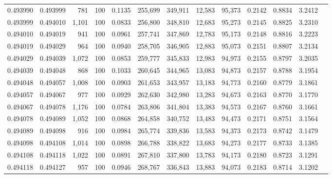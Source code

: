 \begin{tabular}{rrrrrrrrrrrrr}
0.493990 & 0.493999 &   781 & 100 &                                     0.1135 & 255,699 & 349,911 &  12,583 &  95,373 & 0.2142 & 0.8834 & 3.2412 \\
0.493999 & 0.494010 & 1,101 & 100 &                                     0.0833 & 256,800 & 348,810 &  12,683 &  95,273 & 0.2145 & 0.8825 & 3.2310 \\
0.494010 & 0.494019 &   941 & 100 &                                     0.0961 & 257,741 & 347,869 &  12,783 &  95,173 & 0.2148 & 0.8816 & 3.2223 \\
0.494019 & 0.494029 &   964 & 100 &                                     0.0940 & 258,705 & 346,905 &  12,883 &  95,073 & 0.2151 & 0.8807 & 3.2134 \\
0.494029 & 0.494039 & 1,072 & 100 &                                     0.0853 & 259,777 & 345,833 &  12,983 &  94,973 & 0.2155 & 0.8797 & 3.2035 \\
0.494039 & 0.494048 &   868 & 100 &                                     0.1033 & 260,645 & 344,965 &  13,083 &  94,873 & 0.2157 & 0.8788 & 3.1954 \\
0.494048 & 0.494057 & 1,008 & 100 &                                     0.0903 & 261,653 & 343,957 &  13,183 &  94,773 & 0.2160 & 0.8779 & 3.1861 \\
0.494057 & 0.494067 &   977 & 100 &                                     0.0929 & 262,630 & 342,980 &  13,283 &  94,673 & 0.2163 & 0.8770 & 3.1770 \\
0.494067 & 0.494078 & 1,176 & 100 &                                     0.0784 & 263,806 & 341,804 &  13,383 &  94,573 & 0.2167 & 0.8760 & 3.1661 \\
0.494078 & 0.494089 & 1,052 & 100 &                                     0.0868 & 264,858 & 340,752 &  13,483 &  94,473 & 0.2171 & 0.8751 & 3.1564 \\
0.494089 & 0.494098 &   916 & 100 &                                     0.0984 & 265,774 & 339,836 &  13,583 &  94,373 & 0.2173 & 0.8742 & 3.1479 \\
0.494098 & 0.494108 & 1,014 & 100 &                                     0.0898 & 266,788 & 338,822 &  13,683 &  94,273 & 0.2177 & 0.8733 & 3.1385 \\
0.494108 & 0.494118 & 1,022 & 100 &                                     0.0891 & 267,810 & 337,800 &  13,783 &  94,173 & 0.2180 & 0.8723 & 3.1291 \\
0.494118 & 0.494127 &   957 & 100 &                                     0.0946 & 268,767 & 336,843 &  13,883 &  94,073 & 0.2183 & 0.8714 & 3.1202 \\

\end{tabular}
